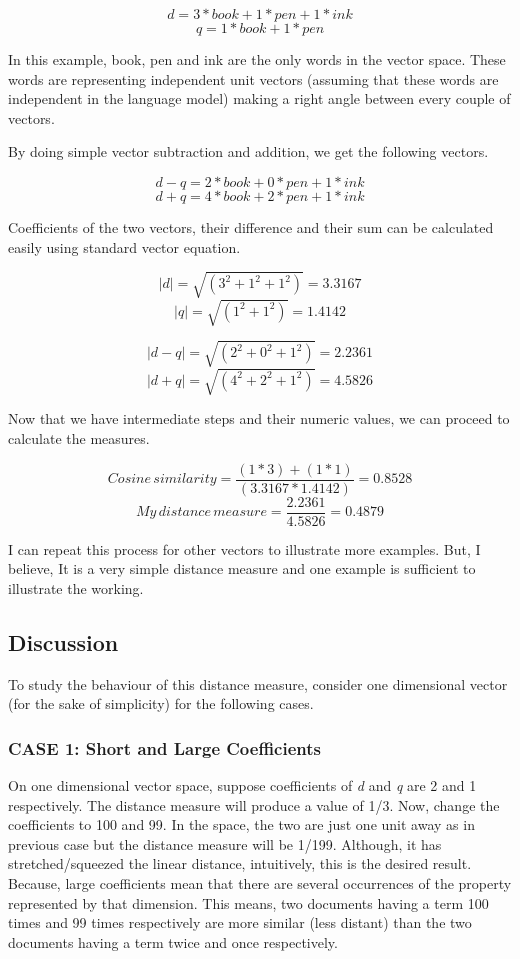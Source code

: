 \documentclass[letterpaper,12pt]{article}
\begin{document}
$$ d = 3*book + 1*pen + 1*ink $$
$$ q = 1*book + 1*pen $$

In this example, book, pen and ink are the only words in the vector space. These words are representing independent unit vectors (assuming that these words are independent in the language model) making a right angle between every couple of vectors.

By doing simple vector subtraction and addition, we get the following vectors.

$$ d - q = 2*book + 0*pen + 1*ink $$
$$ d + q = 4*book + 2*pen + 1*ink $$

Coefficients of the two vectors, their difference and their sum can be calculated easily using standard vector equation.

$$ |d| = \sqrt{(3^2 + 1^2 + 1^2)} = 3.3167 $$
$$ |q| = \sqrt{(1^2 + 1^2)} = 1.4142 $$

$$ |d - q| = \sqrt{(2^2 + 0^2 + 1^2)} = 2.2361 $$
$$ |d + q| = \sqrt{(4^2 + 2^2 + 1^2)} = 4.5826 $$

Now that we have intermediate steps and their numeric values, we can proceed to calculate the measures.

$$ Cosine\,similarity = \frac{(1*3) + (1*1)}{(3.3167*1.4142)} = 0.8528 $$
$$ My\,distance\,measure = \frac{2.2361}{4.5826} = 0.4879 $$

I can repeat this process for other vectors to illustrate more examples. But, I believe, It is a very simple distance measure and one example is sufficient to illustrate the working.


\subsection{Discussion}

To study the behaviour of this distance measure, consider one dimensional vector (for the sake of simplicity) for the following cases.

\subsubsection{CASE 1: Short and Large Coefficients}

On one dimensional vector space, suppose coefficients of \emph{d} and \emph{q} are 2 and 1 respectively. The distance measure will produce a value of 1/3. Now, change the coefficients to 100 and 99. In the space, the two are just one unit away as in previous case but the distance measure will be 1/199. Although, it has stretched/squeezed the linear distance, intuitively, this is the desired result. Because, large coefficients mean that there are several occurrences of the property represented by that dimension. This means, two documents having a term 100 times and 99 times respectively are more similar (less distant) than the two documents having a term twice and once respectively.
\end{document}
